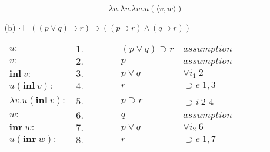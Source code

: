 \documentclass[11pt,a4paper]{article}
\begin{document}
\begin{itemize}
\begin{table}[H]
\begin{tabular}{*{10}{l}}
		\end{tabular}
		\end{table}
		
		\[ \boxed{\lambda u .\lambda v . \lambda w . u(\langle v, w \rangle)} \]
		
		
\item[(b)]
$\cdot\vdash ((p \vee q) \supset r) \supset ((p \supset r) \wedge (q \supset r)) $
		\begin{table}[H]
		\centering
		\begin{tabular}{*{10}{l}}
			
			\cline{3-10}
			
			$u:$ & $1.$ &\multicolumn{1}{|c}{} & & & $(p \lor q) \supset r$ & $assumption$ & & &\multicolumn{1}{c|}{}\\
			
			\cline{4-9}
			
			$v:$ & $2.$ & \multicolumn{1}{|c}{} & \multicolumn{1}{|c}{} &  & $p$ & $assumption$ & & \multicolumn{1}{c|}{} &\multicolumn{1}{c|}{}\\
			
			$\textbf{inl} \ v:$ & $3.$ & \multicolumn{1}{|c}{} & \multicolumn{1}{|c}{} &  & $p \lor q$ & $\lor i_1 \ 2$ & & \multicolumn{1}{c|}{} &\multicolumn{1}{c|}{}\\
			
			$u(\textbf{inl} \ v):$ & $4.$ & \multicolumn{1}{|c}{} & \multicolumn{1}{|c}{} &  & $r$ & $\supset e \ 1, 3$ & & \multicolumn{1}{c|}{} &\multicolumn{1}{c|}{}\\
			
			\cline{4-9}
			
			$\lambda v . u(\textbf{inl} \ v):$ & $5.$ & \multicolumn{1}{|c}{} & & & $p \supset r$ & $\supset i \ 2$-$4$ & & & \multicolumn{1}{c|}{}\\
			
			\cline{4-9}
			
			$w:$ & $6.$ & \multicolumn{1}{|c}{} & \multicolumn{1}{|c}{} &  & $q$ & $assumption$ & & \multicolumn{1}{c|}{} &\multicolumn{1}{c|}{}\\
			
			$\textbf{inr} \ w:$ & $7.$ & \multicolumn{1}{|c}{} & \multicolumn{1}{|c}{} &  & $p \lor q$ & $\lor i_2 \ 6$ & & \multicolumn{1}{c|}{} &\multicolumn{1}{c|}{}\\
			
			$u(\textbf{inr} \ w):$ & $8.$ & \multicolumn{1}{|c}{} & \multicolumn{1}{|c}{} &  & $r$ & $\supset e \ 1, 7$ & & \multicolumn{1}{c|}{} &\multicolumn{1}{c|}{}\\
			

\end{tabular}
\end{table}
\end{itemize}
\end{document}
